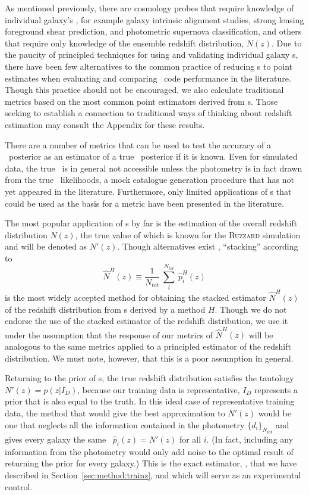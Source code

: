As mentioned previously, there are cosmology probes that require knowledge of individual galaxy's \pzpdf, for example galaxy intrinsic alignment studies, strong lensing foreground shear prediction, and photometric supernova classification, and others that require only knowledge of the ensemble redshift distribution, $N(z)$.
Due to the paucity of principled techniques for using and validating individual galaxy \pzpdf s, there have been few alternatives to the common practice of reducing \pzpdf s to point estimates when evaluating and comparing \pz\ code performance in the literature.
Though this practice should not be encouraged, we also calculate traditional metrics based on the most common point estimators derived from \pzpdf s.
Those seeking to establish a connection to traditional ways of thinking about redshift estimation may consult the Appendix for these results.

There are a number of metrics that can be used to test the accuracy of a \pz\ posterior as an estimator of a true \pz\ posterior if it is known.
Even for simulated data, the true \pzpdf\ is in general not accessible unless the photometry is in fact drawn from the true \pz\ likelihoods, a mock catalogue generation procedure that has not yet appeared in the literature.
Furthermore, only limited applications of \pzpdf s that could be used as the basis for a metric have been presented in the literature.

The most popular application of \pzpdf s by far is the estimation of the overall redshift distribution $N(z)$, the true value of which is known for the \textsc{Buzzard} simulation and will be denoted as $N'(z)$.
Though alternatives exist \citep{Malz:chippr}, ``stacking'' according to
\begin{equation} \label{eq:stacked}
\hat{N}^{H}(z) \equiv \frac{1}{N_{tot}}\ \sum_{i}^{N_{tot}}\ \hat{p}^{H}_{i}(z)
\end{equation}
is the most widely accepted method for obtaining the stacked estimator $\hat{N}^{H}(z)$ of the redshift distribution from \pzpdf s derived by a method $H$.
Though we do not endorse the use of the stacked estimator of the redshift distribution, we use it under the assumption that the response of our metrics of $\hat{N}^{H}(z)$ will be analogous to the same metrics applied to a principled estimator of the redshift distribution.
We must note, however, that this is a poor assumption in general.

Returning to the prior of \pzpdf s, the true redshift distribution satisfies the tautology $N'(z) = p(z | I_{D})$, because our training data is representative, $I_{D}$ represents a prior that is also equal to the truth.
In this ideal case of representative training data, the method that would give the best approximation to $N'(z)$ would be one that neglects all the information contained in the photometry $\{d_{i}\}_{N_{tot}}$ and gives every galaxy the same \pzpdf\ $\hat{p}_{i}(z) = N'(z)$ for all $i$.
(In fact, including any information from the photometry would only add noise to the optimal result of returning the prior for every galaxy.)
This is the exact estimator, \trainz, that we have described in Section~\ref{sec:method:trainz}, and which will serve as an experimental control.

